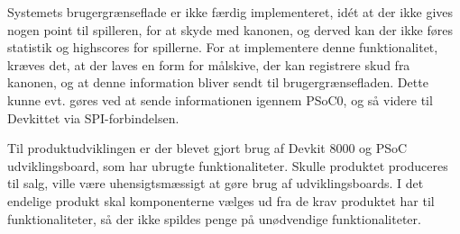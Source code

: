 \noindent Systemets brugergrænseflade er ikke færdig implementeret, idét at der ikke gives nogen point til spilleren, for at skyde med kanonen, og derved kan der ikke føres statistik og highscores for spillerne. For at implementere denne funktionalitet, kræves det, at der laves en form for målskive, der kan registrere skud fra kanonen, og at denne information bliver sendt til brugergrænsefladen. Dette kunne evt. gøres ved at sende informationen igennem PSoC0, og så videre til Devkittet via SPI-forbindelsen. \newline

\noindent Til produktudviklingen er der blevet gjort brug af Devkit 8000 og PSoC udviklingsboard, som har ubrugte funktionaliteter. Skulle produktet produceres til salg, ville være uhensigtsmæssigt at gøre brug af udviklingsboards. I det endelige produkt skal komponenterne vælges ud fra de krav produktet har til funktionaliteter, så der ikke spildes penge på unødvendige funktionaliteter.